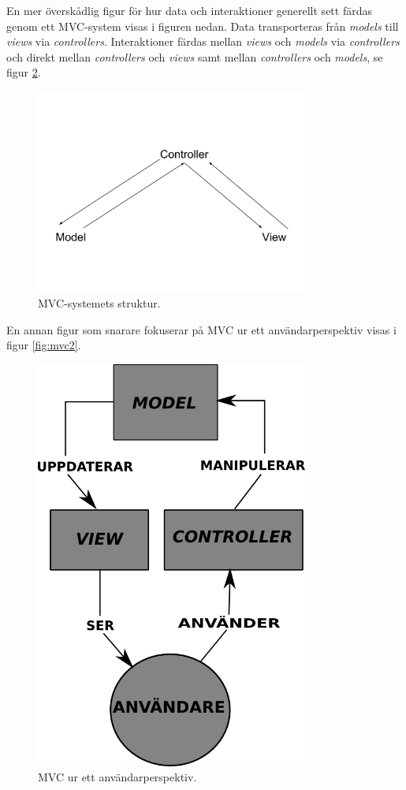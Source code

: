 En mer överskådlig figur för hur data och interaktioner generellt sett färdas genom ett MVC-system visas i figuren nedan. Data transporteras från \textit{models} till \textit{views} via \textit{controllers}. Interaktioner färdas mellan \textit{views} och \textit{models} via \textit{controllers} och direkt mellan \textit{controllers} och \textit{views} samt mellan \textit{controllers} och \textit{models}, se figur \ref{fig:mvc1}.

\begin{figure}[!H]
\centering
\includegraphics[width=0.8\textwidth]{figures/mvc1.png}
\caption{MVC-systemets struktur.}
\label{fig:mvc1}
\end{figure}

En annan figur som snarare fokuserar på MVC ur ett användarperspektiv visas i figur \ref{fig:mvc2}.

\begin{figure}[!H]
\centering
\includegraphics[width=0.8\textwidth]{figures/mvc_user.png}
\caption{MVC ur ett användarperspektiv.}
\label{fig:mvc1}
\end{figure}

